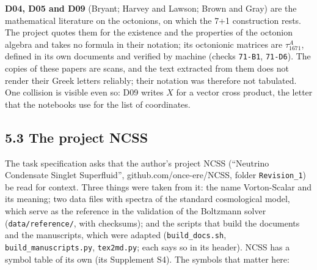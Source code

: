 \documentclass[
  10pt,
]{article}
\begin{document}
\textbf{D04, D05 and D09} (Bryant; Harvey and Lawson; Brown and Gray)
are the mathematical literature on the octonions, on which the 7+1
construction rests. The project quotes them for the existence and the
properties of the octonion algebra and takes no formula in their
notation; its octonionic matrices are \(\tau_{1671}^A\), defined in its
own documents and verified by machine (checks \texttt{71-B1},
\texttt{71-D6}). The copies of these papers are scans, and the text
extracted from them does not render their Greek letters reliably; their
notation was therefore not tabulated. One collision is visible even so:
D09 writes \(X\) for a vector cross product, the letter that the
notebooks use for the list of coordinates.

\hypertarget{the-project-ncss}{%
\subsection{5.3 The project NCSS}\label{the-project-ncss}}

The task specification asks that the author's project NCSS (``Neutrino
Condensate Singlet Superfluid'', github.com/once-ere/NCSS, folder
\texttt{Revision\_1}) be read for context. Three things were taken from
it: the name Vorton-Scalar and its meaning; two data files with spectra
of the standard cosmological model, which serve as the reference in the
validation of the Boltzmann solver (\texttt{data/reference/}, with
checksums); and the scripts that build the documents and the
manuscripts, which were adapted (\texttt{build\_docs.sh},
\texttt{build\_manuscripts.py}, \texttt{tex2md.py}; each says so in its
header). NCSS has a symbol table of its own (its Supplement S4). The
symbols that matter here:
\end{document}
